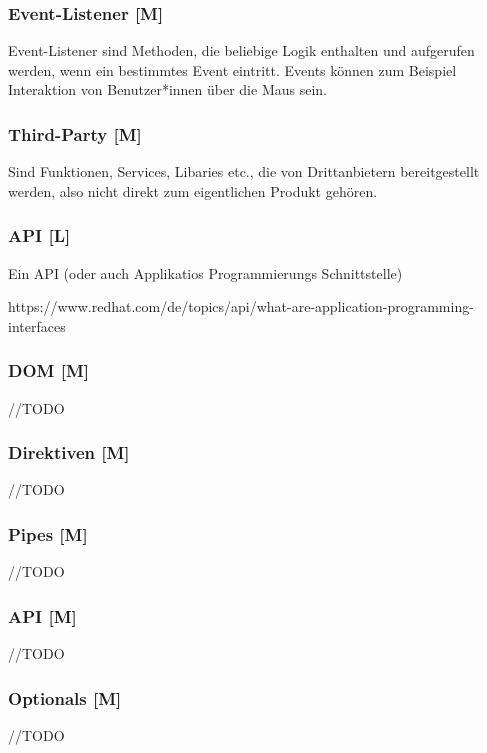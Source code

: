 \subsubsection{Event-Listener [M]}
Event-Listener sind Methoden, die beliebige Logik enthalten und aufgerufen werden, wenn ein bestimmtes Event eintritt. Events können zum Beispiel Interaktion von Benutzer*innen über die Maus sein. 

\subsubsection{Third-Party [M]}
Sind Funktionen, Services, Libaries etc., die von Drittanbietern bereitgestellt werden, also nicht direkt zum eigentlichen Produkt gehören. 

\subsubsection{API [L]}
Ein API (oder auch Applikatios Programmierungs Schnittstelle)

https://www.redhat.com/de/topics/api/what-are-application-programming-interfaces

\subsubsection{DOM [M]}
//TODO 

\subsubsection{Direktiven [M]}
//TODO

\subsubsection{Pipes [M]}
//TODO

\subsubsection{API [M]}
//TODO

\subsubsection{Optionals [M]}
//TODO